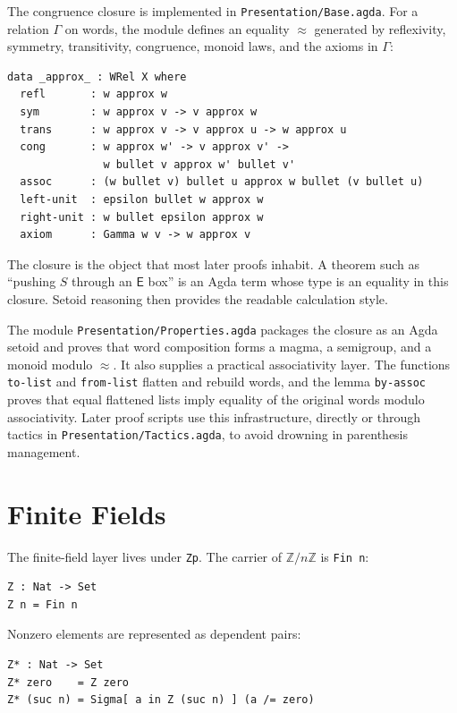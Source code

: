 \documentclass[sigplan,screen,review,anonymous]{acmart}
\newcommand{\Agda}{Agda\xspace}
\newcommand{\EBox}{\mathsf{E}}
\newcommand{\file}[1]{\texttt{#1}}
\begin{document}
The congruence closure is implemented in \file{Presentation/Base.agda}.
For a relation \(\Gamma\) on words, the module defines an equality
\(\approx\) generated by reflexivity, symmetry, transitivity,
congruence, monoid laws, and the axioms in \(\Gamma\):

\begin{lstlisting}
data _approx_ : WRel X where
  refl       : w approx w
  sym        : w approx v -> v approx w
  trans      : w approx v -> v approx u -> w approx u
  cong       : w approx w' -> v approx v' ->
               w bullet v approx w' bullet v'
  assoc      : (w bullet v) bullet u approx w bullet (v bullet u)
  left-unit  : epsilon bullet w approx w
  right-unit : w bullet epsilon approx w
  axiom      : Gamma w v -> w approx v
\end{lstlisting}

The closure is the object that most later proofs inhabit.  A theorem
such as ``pushing \(S\) through an \(\EBox\) box'' is an \Agda term
whose type is an equality in this closure.  Setoid reasoning then
provides the readable calculation style.

The module \file{Presentation/Properties.agda} packages the closure
as an \Agda setoid and proves that word composition forms a magma, a
semigroup, and a monoid modulo \(\approx\).  It also supplies a
practical associativity layer.  The functions \texttt{to-list} and
\texttt{from-list} flatten and rebuild words, and the lemma
\texttt{by-assoc} proves that equal flattened lists imply equality of
the original words modulo associativity.  Later proof scripts use this
infrastructure, directly or through tactics in
\file{Presentation/Tactics.agda}, to avoid drowning in parenthesis
management.

\section{Finite Fields}

The finite-field layer lives under \file{Zp}.  The carrier of
\(\mathbb{Z}/n\mathbb{Z}\) is \texttt{Fin n}:

\begin{lstlisting}
Z : Nat -> Set
Z n = Fin n
\end{lstlisting}

Nonzero elements are represented as dependent pairs:

\begin{lstlisting}
Z* : Nat -> Set
Z* zero    = Z zero
Z* (suc n) = Sigma[ a in Z (suc n) ] (a /= zero)
\end{lstlisting}
\end{document}

